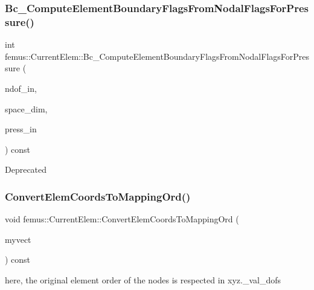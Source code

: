 \subsubsection{\texorpdfstring{Bc\+\_\+\+Compute\+Element\+Boundary\+Flags\+From\+Nodal\+Flags\+For\+Pressure()}{Bc\_ComputeElementBoundaryFlagsFromNodalFlagsForPressure()}}
{\footnotesize\ttfamily int femus\+::\+Current\+Elem\+::\+Bc\+\_\+\+Compute\+Element\+Boundary\+Flags\+From\+Nodal\+Flags\+For\+Pressure (\begin{DoxyParamCaption}\item[{const \mbox{\hyperlink{_typedefs_8hpp_a91ad9478d81a7aaf2593e8d9c3d06a14}{uint}}}]{ndof\+\_\+in,  }\item[{const \mbox{\hyperlink{_typedefs_8hpp_a91ad9478d81a7aaf2593e8d9c3d06a14}{uint}}}]{space\+\_\+dim,  }\item[{const \mbox{\hyperlink{classfemus_1_1_current_quantity}{Current\+Quantity}} \&}]{press\+\_\+in }\end{DoxyParamCaption}) const}

\begin{DoxyRefDesc}{Deprecated}
\item[\mbox{\hyperlink{deprecated__deprecated000007}{Deprecated}}]\end{DoxyRefDesc}
\mbox{\label{classfemus_1_1_current_elem_a6de5a8d1e1da9f2befa896088cdf676d}} 
\subsubsection{\texorpdfstring{Convert\+Elem\+Coords\+To\+Mapping\+Ord()}{ConvertElemCoordsToMappingOrd()}}
{\footnotesize\ttfamily void femus\+::\+Current\+Elem\+::\+Convert\+Elem\+Coords\+To\+Mapping\+Ord (\begin{DoxyParamCaption}\item[{\mbox{\hyperlink{classfemus_1_1_current_quantity}{Current\+Quantity}} \&}]{myvect }\end{DoxyParamCaption}) const}



here, the original element order of the nodes is respected in xyz.\+\_\+val\+\_\+dofs 

